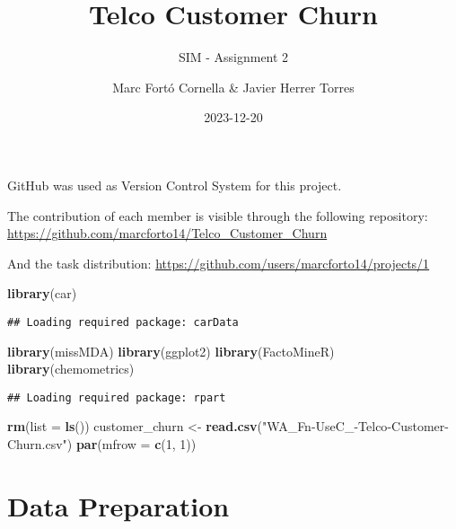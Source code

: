 \documentclass[
  a4paper]{article}
\title{Telco Customer Churn}
\subtitle{SIM - Assignment 2}
\author{Marc Fortó Cornella \& Javier Herrer Torres}
\date{2023-12-20}
\newenvironment{Shaded}{\begin{snugshade}}{\end{snugshade}}
\newcommand{\AttributeTok}[1]{\textcolor[rgb]{0.13,0.29,0.53}{#1}}
\newcommand{\DecValTok}[1]{\textcolor[rgb]{0.00,0.00,0.81}{#1}}
\newcommand{\FunctionTok}[1]{\textcolor[rgb]{0.13,0.29,0.53}{\textbf{#1}}}
\newcommand{\NormalTok}[1]{#1}
\newcommand{\OtherTok}[1]{\textcolor[rgb]{0.56,0.35,0.01}{#1}}
\newcommand{\StringTok}[1]{\textcolor[rgb]{0.31,0.60,0.02}{#1}}
\begin{document}
\maketitle

{
\setcounter{tocdepth}{3}
\tableofcontents
}
GitHub was used as Version Control System for this project.

The contribution of each member is visible through the following
repository: \url{https://github.com/marcforto14/Telco_Customer_Churn}

And the task distribution:
\url{https://github.com/users/marcforto14/projects/1}

\begin{Shaded}
\begin{Highlighting}[]
\FunctionTok{library}\NormalTok{(car)}
\end{Highlighting}
\end{Shaded}

\begin{verbatim}
## Loading required package: carData
\end{verbatim}

\begin{Shaded}
\begin{Highlighting}[]
\FunctionTok{library}\NormalTok{(missMDA)}
\FunctionTok{library}\NormalTok{(ggplot2)}
\FunctionTok{library}\NormalTok{(FactoMineR)}
\FunctionTok{library}\NormalTok{(chemometrics)}
\end{Highlighting}
\end{Shaded}

\begin{verbatim}
## Loading required package: rpart
\end{verbatim}

\begin{Shaded}
\begin{Highlighting}[]
\FunctionTok{rm}\NormalTok{(}\AttributeTok{list =} \FunctionTok{ls}\NormalTok{())}
\NormalTok{customer\_churn }\OtherTok{\textless{}{-}} \FunctionTok{read.csv}\NormalTok{(}\StringTok{"WA\_Fn{-}UseC\_{-}Telco{-}Customer{-}Churn.csv"}\NormalTok{)}
\FunctionTok{par}\NormalTok{(}\AttributeTok{mfrow =} \FunctionTok{c}\NormalTok{(}\DecValTok{1}\NormalTok{, }\DecValTok{1}\NormalTok{))}
\end{Highlighting}
\end{Shaded}

\hypertarget{data-preparation}{%
\section{Data Preparation}\label{data-preparation}}
\end{document}
